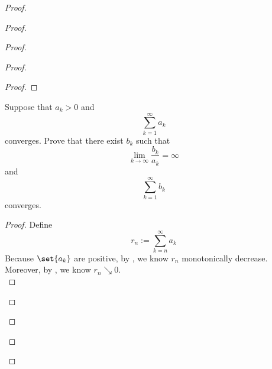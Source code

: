 \documentclass{report}
\begin{document}
\begin{proof}
\begin{proof}
\begin{proof}
\begin{proof}
\begin{proof}
\end{proof}
\begin{question}{}{}
Suppose that \( a_k > 0 \) and 
\[
\sum_{k=1}^{\infty} a_k
\]
converges. Prove that there exist \( b_k \) such that 
\[
\lim_{k \to \infty} \frac{b_k}{a_k} = \infty
\]
and 
\[
\sum_{k=1}^{\infty} b_k
\]
converges.
\end{question}
\begin{proof}
Define
\begin{equation*}
r_n:=\sum_{k=n}^\infty a_k
\end{equation*}
Because $\set{a_k}$ are positive, by , we know $r_n$ monotonically decrease.\\

Moreover, by , we know $r_n\searrow 0$.\\


\end{proof}
\end{proof}
\end{proof}
\end{proof}
\end{proof}
\end{document}
